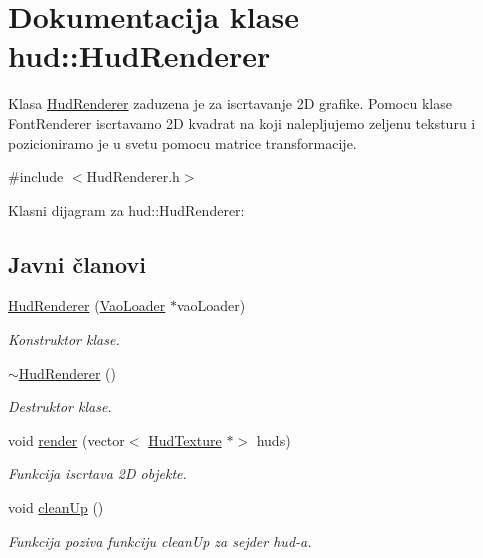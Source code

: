 \hypertarget{classhud_1_1HudRenderer}{}\section{Dokumentacija klase hud\+:\+:Hud\+Renderer}
\label{classhud_1_1HudRenderer}


Klasa \hyperlink{classhud_1_1HudRenderer}{Hud\+Renderer} zaduzena je za iscrtavanje 2D grafike. Pomocu klase Font\+Renderer iscrtavamo 2D kvadrat na koji nalepljujemo zeljenu teksturu i pozicioniramo je u svetu pomocu matrice transformacije.  




{\ttfamily \#include $<$Hud\+Renderer.\+h$>$}



Klasni dijagram za hud\+:\+:Hud\+Renderer\+:
\subsection*{Javni članovi}
\begin{DoxyCompactItemize}
\item 
\hyperlink{classhud_1_1HudRenderer_ae84f8293c08515d5a7b3e23632b8b6b0}{Hud\+Renderer} (\hyperlink{classcore_1_1VaoLoader}{Vao\+Loader} $\ast$vao\+Loader)
\begin{DoxyCompactList}\small\item\em Konstruktor klase. \end{DoxyCompactList}\item 
\hyperlink{classhud_1_1HudRenderer_abe526b3d520a64670efa3d3aaa986d52}{$\sim$\+Hud\+Renderer} ()
\begin{DoxyCompactList}\small\item\em Destruktor klase. \end{DoxyCompactList}\item 
void \hyperlink{classhud_1_1HudRenderer_a9b64ac407d7e3f8fa9de46ee7f32fd17}{render} (vector$<$ \hyperlink{classhud_1_1HudTexture}{Hud\+Texture} $\ast$$>$ huds)
\begin{DoxyCompactList}\small\item\em Funkcija iscrtava 2D objekte. \end{DoxyCompactList}\item 
void \hyperlink{classhud_1_1HudRenderer_a17ec594190149eee1db61bed6034daae}{clean\+Up} ()
\begin{DoxyCompactList}\small\item\em Funkcija poziva funkciju clean\+Up za sejder hud-\/a. \end{DoxyCompactList}\end{DoxyCompactItemize}
